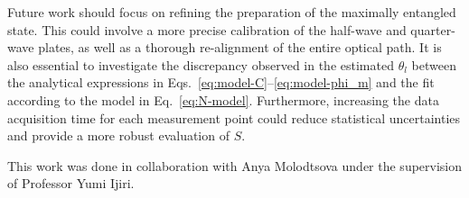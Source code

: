 \documentclass{../paper}
\newcommand{\eq}[1]{Eq.~\eqref{#1}}
\newcommand{\eqs}[2]{Eqs.~\eqref{#1}--\eqref{#2}}
\begin{document}
Future work should focus on refining the preparation of the maximally entangled state. This could involve a more precise calibration of the half-wave and quarter-wave plates, as well as a thorough re-alignment of the entire optical path. It is also essential to investigate the discrepancy observed in the estimated $\theta_l$ between the analytical expressions in \eqs{eq:model-C}{eq:model-phi_m} and the fit according to the model in \eq{eq:N-model}. Furthermore, increasing the data acquisition time for each measurement point could reduce statistical uncertainties and provide a more robust evaluation of $S$.

\begin{acknowledgements}
  This work was done in collaboration with Anya Molodtsova under the supervision of Professor Yumi Ijiri.
\end{acknowledgements}


\end{document}
